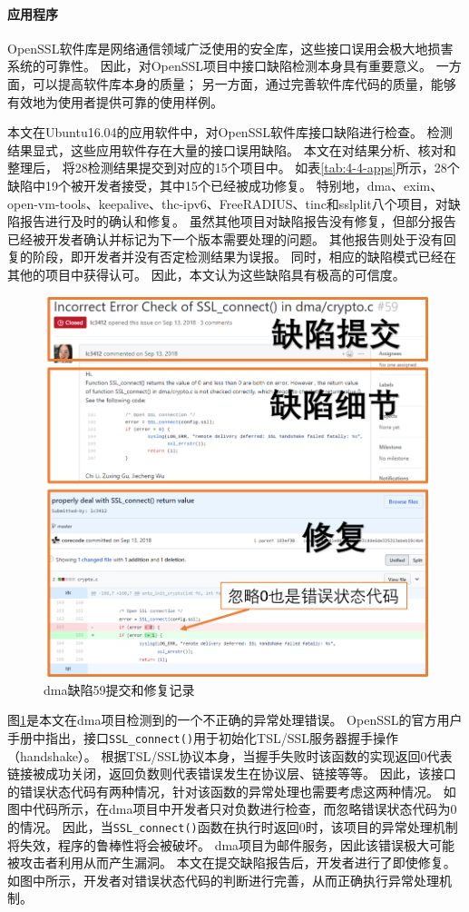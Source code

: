 \paragraph{应用程序}



OpenSSL软件库是网络通信领域广泛使用的安全库，这些接口误用会极大地损害系统的可靠性。
因此，对OpenSSL项目中接口缺陷检测本身具有重要意义。
一方面，可以提高软件库本身的质量；
另一方面，通过完善软件库代码的质量，能够有效地为使用者提供可靠的使用样例。

本文在Ubuntu16.04的应用软件中，对OpenSSL软件库接口缺陷进行检查。
检测结果显式，这些应用软件存在大量的接口误用缺陷。
本文在对结果分析、核对和整理后，
将28检测结果提交到对应的15个项目中。
如表\ref{tab:4-4-apps}所示，28个缺陷中19个被开发者接受，其中15个已经被成功修复。
特别地，dma、exim、open-vm-tools、keepalive、thc-ipv6、FreeRADIUS、tinc和sslplit八个项目，对缺陷报告进行及时的确认和修复。
虽然其他项目对缺陷报告没有修复，但部分报告已经被开发者确认并标记为下一个版本需要处理的问题。
其他报告则处于没有回复的阶段，即开发者并没有否定检测结果为误报。
同时，相应的缺陷模式已经在其他的项目中获得认可。
因此，本文认为这些缺陷具有极高的可信度。

\begin{figure}[t]
	\centering
	\includegraphics[width=0.8\linewidth]{figures/cp4-dma-example.png}
	\caption{
		dma缺陷59提交和修复记录
	}
	\label{fig:4-4-dma-example}
\end{figure}

图\ref{fig:4-4-dma-example}是本文在dma项目检测到的一个不正确的异常处理错误。
OpenSSL的官方用户手册中指出，接口\texttt{SSL\_connect()}用于初始化TSL/SSL服务器握手操作（handshake）。
根据TSL/SSL协议本身，当握手失败时该函数的实现返回0代表链接被成功关闭，返回负数则代表错误发生在协议层、链接等等。
因此，该接口的错误状态代码有两种情况，针对该函数的异常处理也需要考虑这两种情况。
如图中代码所示，在dma项目中开发者只对负数进行检查，而忽略错误状态代码为0的情况。
因此，当\texttt{SSL\_connect()}函数在执行时返回0时，该项目的异常处理机制将失效，程序的鲁棒性将会被破坏。
dma项目为邮件服务，因此该错误极大可能被攻击者利用从而产生漏洞。
本文在提交缺陷报告后，开发者进行了即使修复。
如图中所示，开发者对错误状态代码的判断进行完善，从而正确执行异常处理机制。



